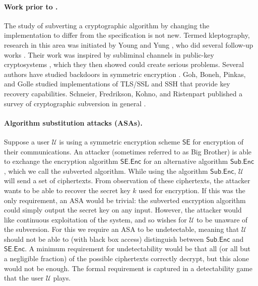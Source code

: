 \paragraph{Work prior to \cite{C:BelPatRog14}.} The study of subverting a cryptographic algorithm by changing the implementation to differ from the specification is not new. Termed kleptography, research in this area was initiated by Young and Yung \cite{C:YouYun96}, who did several follow-up works  \cite{EC:YouYun97,FSE:YouYun98,SAC:YouYun04,ACISP:YouYun03}. Their work was inspired by subliminal channels in public-key cryptosystems \cite{EC:Simmons84,C:Desmedt88}, which they then showed could create serious problems. Several authors have studied backdoors in symmetric encryption \cite{FSE:RijPre97,FSE:Paterson99}. Goh, Boneh, Pinkas, and Golle \cite{ISC:GBPG03} studied implementations of TLS/SSL and SSH that provide key recovery capabilities. Schneier, Fredrikson, Kohno, and Ristenpart published a survey of cryptographic subversion in general \cite{EPRINT:SFKR15}.

\paragraph{Algorithm substitution attacks (ASAs).} Suppose a user $\mathcal{U}$ is using a symmetric encryption scheme $\mathsf{SE}$ for encryption of their communications. An attacker (sometimes referred to as Big Brother) is able to exchange the encryption algorithm $\mathsf{SE.Enc}$ for an alternative algorithm $\mathsf{Sub.Enc}$, which we call the subverted algorithm. While using the algorithm $\mathsf{Sub.Enc}$, $\mathcal{U}$ will send a set of ciphertexts. From observation of these ciphertexts, the attacker wants to be able to recover the secret key $k$ used for encryption. If this was the only requirement, an ASA would be trivial: the subverted encryption algorithm could simply output the secret key on any input. However, the attacker would like continuous exploitation of the system, and so wishes for $\mathcal{U}$ to be unaware of the subversion. For this we require an ASA to be undetectable, meaning that $\mathcal{U}$ should not be able to (with black box access) distinguish between  $\mathsf{Sub.Enc}$ and $\mathsf{SE.Enc}$. A minimum requirement for undetectability would be that all (or all but a negligible fraction) of the possible ciphertexts correctly decrypt, but this alone would not be enough. The formal requirement is captured in a detectability game that the user $\mathcal{U}$ plays.

